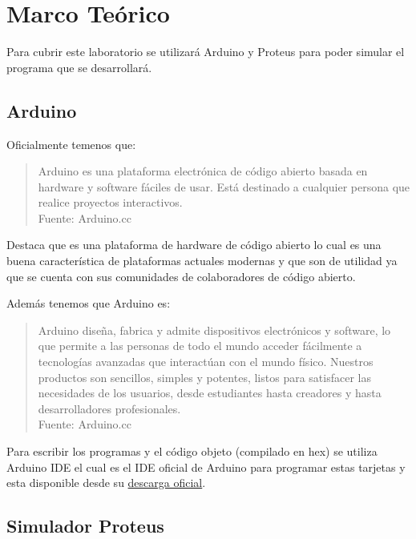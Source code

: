 \documentclass{article}
\begin{document}
\section{Marco Teórico}

Para cubrir este laboratorio se utilizará Arduino y Proteus para poder simular el programa que se desarrollará.

\subsection{Arduino}

Oficialmente temenos que:

\begin{quote}
    Arduino es una plataforma electrónica de código abierto basada en hardware y software fáciles de usar. Está destinado a cualquier persona que realice proyectos interactivos.\\ \footnotesize
    Fuente: Arduino.cc \cite{arduino-2022}
\end{quote}

Destaca que es una plataforma de hardware de código abierto lo cual es una buena característica de plataformas actuales modernas y que son de utilidad ya que se cuenta con sus comunidades de colaboradores de código abierto.

Además tenemos que Arduino es:

\begin{quote}
    Arduino diseña, fabrica y admite dispositivos electrónicos y software, lo que permite a las personas de todo el mundo acceder fácilmente a tecnologías avanzadas que interactúan con el mundo físico. Nuestros productos son sencillos, simples y potentes, listos para satisfacer las necesidades de los usuarios, desde estudiantes hasta creadores y hasta desarrolladores profesionales. \\ \footnotesize
    Fuente: Arduino.cc \cite{arduino-2022}
\end{quote}

Para escribir los programas y el código objeto (compilado en hex) se utiliza Arduino IDE el cual es el IDE oficial de Arduino para programar estas tarjetas y esta disponible desde su \href{https://docs.arduino.cc/software/ide-v2/tutorials/getting-started/ide-v2-downloading-and-installing}{descarga oficial}.

\subsection{Simulador Proteus}
\end{document}
